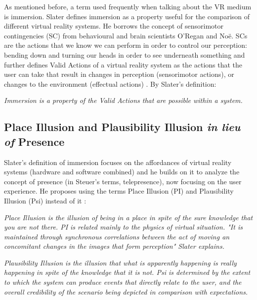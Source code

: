 As mentioned before, a term used frequently when talking about the VR medium is immersion. Slater defines immersion as a property useful for the comparison of different virtual reality systems. He borrows the concept of sensorimotor contingencies (SC) from behavioural and brain scientists O'Regan and Noë. SCs are the actions that we know we can perform in order to control our perception: bending down and turning our heads in order to see underneath something and further defines Valid Actions of a virtual reality system as the actions that the user can take that result in changes in perception (sensorimotor actions), or changes to the environment (effectual actions) \parencite{Slater2009}. By Slater's definition:

\begin{displayquote}
\textit{Immersion is a property of the Valid Actions that are possible within a system.}
\end{displayquote}

\subsection{Place Illusion and Plausibility Illusion \textit{in lieu of} Presence}
\label{subsec:PIandPsi}

Slater's definition of immersion focuses on the affordances \parencite{Norman} of virtual reality systems (hardware and software combined) and he builds on it to analyze the concept of presence (in Steuer's terms, telepresence), now focusing on the user experience. He proposes using the terms Place Illusion (PI) and Plausibility Illusion (Psi) instead of it \parencite{Slater2009}:

\begin{displayquote}
\textit{Place Illusion is the illusion of being in a place in spite of the sure knowledge that you are not there. PI is related mainly to the physics of virtual situation. "It is maintained through synchronous correlations between the act of moving an concomitant changes in the images that form perception" Slater explains.}
\end{displayquote}

\begin{displayquote}
\textit{Plausibility Illusion is the illusion that what is apparently happening is really happening in spite of the knowledge that it is not. Psi is determined by the extent to which the system can produce events that directly relate to the user, and the overall credibility of the scenario being depicted in comparison with expectations.}
\end{displayquote}

